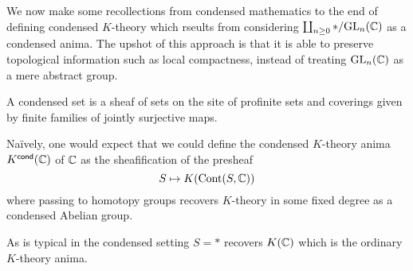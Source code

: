 We now make some recollections from condensed mathematics to the end of defining condensed $K$-theory which rseults from considering $\coprod_{n\geq0}*/\mathrm{GL}_{n}(\mathbb{C})$ as a condensed anima. The upshot of this approach is that it is able to preserve topological information such as local compactness, instead of treating $\mathrm{GL}_{n}(\mathbb{C})$ as a mere abstract group. 
\begin{definition}\label{def: condensed set}
    A condensed set is a sheaf of sets on the site of profinite sets and coverings given by finite families of jointly surjective maps. 
\end{definition}
Na\"{i}vely, one would expect that we could define the condensed $K$-theory anima $K^{\mathsf{cond}}(\mathbb{C})$ of $\mathbb{C}$ as the sheafification of the presheaf 
$$S\mapsto K(\mathrm{Cont}(S,\mathbb{C}))$$
where passing to homotopy groups recovers $K$-theory in some fixed degree as a condensed Abelian group. 
\begin{remark}
    As is typical in the condensed setting $S=*$ recovers $K(\mathbb{C})$ which is the ordinary $K$-theory anima.
\end{remark}

